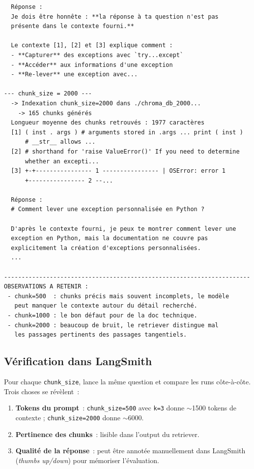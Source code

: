 \documentclass[11pt,a4paper]{article}
\begin{document}
\begin{tcolorbox}[
  colback=white,
  colframe=black!50,
  coltitle=black,
  fonttitle=\footnotesize\bfseries,
  fontupper=\footnotesize,
  title=Sortie de l'exécution,
  breakable,
]
\begin{verbatim}
  Réponse :
  Je dois être honnête : **la réponse à ta question n'est pas
  présente dans le contexte fourni.**

  Le contexte [1], [2] et [3] explique comment :
  - **Capturer** des exceptions avec `try...except`
  - **Accéder** aux informations d'une exception
  - **Re-lever** une exception avec...

--- chunk_size = 2000 ---
  -> Indexation chunk_size=2000 dans ./chroma_db_2000...
    -> 165 chunks générés
  Longueur moyenne des chunks retrouvés : 1977 caractères
  [1] ( inst . args ) # arguments stored in .args ... print ( inst )
      # __str__ allows ...
  [2] # shorthand for 'raise ValueError()' If you need to determine
      whether an excepti...
  [3] +-+---------------- 1 ---------------- | OSError: error 1
      +---------------- 2 --...

  Réponse :
  # Comment lever une exception personnalisée en Python ?

  D'après le contexte fourni, je peux te montrer comment lever une
  exception en Python, mais la documentation ne couvre pas
  explicitement la création d'exceptions personnalisées.
  ...

----------------------------------------------------------------------
OBSERVATIONS A RETENIR :
 - chunk=500  : chunks précis mais souvent incomplets, le modèle
   peut manquer le contexte autour du détail recherché.
 - chunk=1000 : le bon défaut pour de la doc technique.
 - chunk=2000 : beaucoup de bruit, le retriever distingue mal
   les passages pertinents des passages tangentiels.
\end{verbatim}
\end{tcolorbox}

\subsection{Vérification dans LangSmith}

Pour chaque \texttt{chunk\_size}, lance la même question et compare les
runs côte-à-côte. Trois choses se révèlent~:

\begin{enumerate}[leftmargin=*]
  \item \textbf{Tokens du prompt}~: \texttt{chunk\_size=500} avec
        \texttt{k=3} donne $\sim$1500 tokens de contexte ;
        \texttt{chunk\_size=2000} donne $\sim$6000.
  \item \textbf{Pertinence des chunks}~: lisible dans l'output du
        retriever.
  \item \textbf{Qualité de la réponse}~: peut être annotée manuellement
        dans LangSmith (\emph{thumbs up/down}) pour mémoriser l'évaluation.
\end{enumerate}
\end{document}
